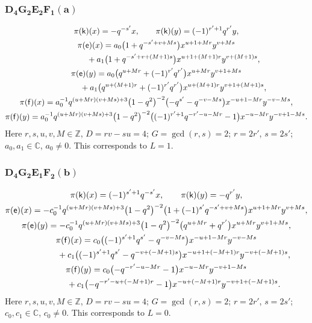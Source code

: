 \documentclass[10pt,a4paper]{amsart}
\numberwithin{equation}{section}
\begin{document}
\subsubsection*{$\boldsymbol{D_4G_2E_2F_1(a)}$}
\begin{gather*}
\pi(\mathsf{k})(x)= -q^{-s'}x ,\qquad\pi(\mathsf{k})(y)=(-1)^{r'+1}q^{r'}y ,\\
\pi(\mathsf{e})(x)= a_0\big(1+q^{-s'+v+Ms}\big)x^{u+1+Mr}y^{v+Ms}\\
\hphantom{\pi(\mathsf{e})(x)=}{}+ a_1\big(1+q^{-s'+v+(M+1)s}\big)x^{u+1+(M+1)r}y^{v+(M+1)s} ,\\
\pi(\mathsf{e})(y)= a_0\big(q^{u+Mr}+(-1)^{r'}q^{r'}\big)x^{u+Mr}y^{v+1+Ms}\\
\hphantom{\pi(\mathsf{e})(y)=}{}+ a_1\big(q^{u+(M+1)r}+(-1)^{r'}q^{r'}\big)x^{u+(M+1)r}y^{v+1+(M+1)s} ,\\
\pi(\mathsf{f})(x)= a_0^{-1}q^{(u+Mr)(v+Ms)+3}\big(1-q^2\big)^{-2}\big({-}q^{s'}-q^{-v-Ms}\big)x^{-u+1-Mr}y^{-v-Ms} ,\\
\pi(\mathsf{f})(y)= a_0^{-1}q^{(u+Mr)(v+Ms)+3}\big(1-q^2\big)^{-2}\big((-1)^{r'+1}q^{-r'-u-Mr}-1\big)x^{-u-Mr}y^{-v+1-Ms} .
\end{gather*}
Here $r,s,u,v,M\in\mathbb{Z}$, $D=rv-su=4$; $G=\operatorname{gcd}(r,s)=2$; $r=2r'$, $s=2s'$; $a_0,a_1\in\mathbb{C}$, $a_0\ne 0$. This corresponds to $L=1$.

\subsubsection*{$\boldsymbol{D_4G_2E_1F_2(b)}$}
\begin{gather*}
\pi(\mathsf{k})(x)= (-1)^{s'+1}q^{-s'}x ,\qquad\pi(\mathsf{k})(y)=-q^{r'}y ,\\
\pi(\mathsf{e})(x)= -c_0^{-1}q^{(u+Mr)(v+Ms)+3}\big(1-q^2\big)^{-2}\big(1+(-1)^{s'}q^{-s'+v+Ms}\big)x^{u+1+Mr}y^{v+Ms} ,\\
\pi(\mathsf{e})(y)= -c_0^{-1}q^{(u+Mr)(v+Ms)+3}\big(1-q^2\big)^{-2}\big(q^{u+Mr}+q^{r'}\big)x^{u+Mr}y^{v+1+Ms} ,\\
\pi(\mathsf{f})(x)= c_0\big((-1)^{s'+1}q^{s'}-q^{-v-Ms}\big)x^{-u+1-Mr}y^{-v-Ms}\\
\hphantom{\pi(\mathsf{f})(x)=}{} + c_1\big((-1)^{s'+1}q^{s'}-q^{-v+(-M+1)s}\big)x^{-u+1+(-M+1)r}y^{-v+(-M+1)s} ,\\
\pi(\mathsf{f})(y)= c_0\big({-}q^{-r'-u-Mr}-1\big)x^{-u-Mr}y^{-v+1-Ms}\\
\hphantom{\pi(\mathsf{f})(y)=}{} + c_1\big({-}q^{-r'-u+(-M+1)r}-1\big)x^{-u+(-M+1)r}y^{-v+1+(-M+1)s} .
\end{gather*}
Here $r,s,u,v,M\in\mathbb{Z}$, $D=rv-su=4$; $G=\operatorname{gcd}(r,s)=2$; $r=2r'$, $s=2s'$; $c_0,c_1\in\mathbb{C}$, $c_0\ne 0$. This corresponds to $L=0$.
\end{document}
